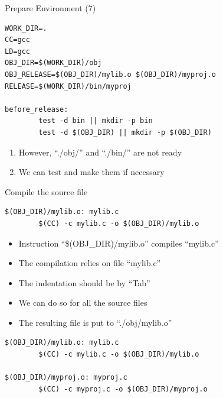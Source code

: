 \begin{frame}[fragile]{Prepare Environment (7)}
\lstset{language=[gnu] make}
\begin{lstlisting}[linewidth=0.9\linewidth, xleftmargin=0.05\linewidth]
WORK_DIR=.
CC=gcc
LD=gcc
OBJ_DIR=$(WORK_DIR)/obj
OBJ_RELEASE=$(OBJ_DIR)/mylib.o $(OBJ_DIR)/myproj.o
RELEASE=$(WORK_DIR)/bin/myproj

before_release:
        test -d bin || mkdir -p bin
        test -d $(OBJ_DIR) || mkdir -p $(OBJ_DIR)
\end{lstlisting}

\begin{enumerate}
	\item {However, ``./obj/'' and ``./bin/'' are not ready }
	\item {We can test and make them if necessary}
\end{enumerate}
\end{frame}

\begin{frame}[fragile]{Compile the source file}
\lstset{language=[gnu] make}
\begin{lstlisting}[linewidth=0.9\linewidth, xleftmargin=0.05\linewidth]
$(OBJ_DIR)/mylib.o: mylib.c
        $(CC) -c mylib.c -o $(OBJ_DIR)/mylib.o
\end{lstlisting}
\vspace{-0.15in}
\begin{itemize}
	\item {Instruction ``\$(OBJ\_DIR)/mylib.o'' compiles ``mylib.c''}
	\item {The compilation relies on file ``mylib.c''}
	\item {The indentation should  be by ``Tab''}
	\item {We can do so for all the source files}
	\item {The resulting file is put to ``./obj/mylib.o'' }
\end{itemize}
\begin{lstlisting}[linewidth=0.9\linewidth, xleftmargin=0.05\linewidth]
$(OBJ_DIR)/mylib.o: mylib.c
        $(CC) -c mylib.c -o $(OBJ_DIR)/mylib.o
        
$(OBJ_DIR)/myproj.o: myproj.c
        $(CC) -c myproj.c -o $(OBJ_DIR)/myproj.o
\end{lstlisting}
\end{frame}

